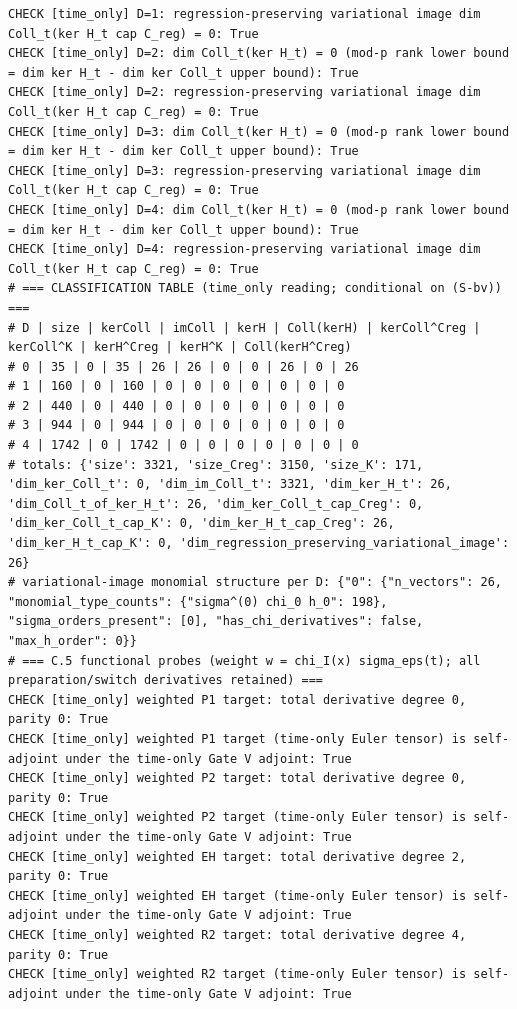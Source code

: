 \documentclass{article}
\theoremstyle{remark}
\begin{document}
\begin{lstlisting}
CHECK [time_only] D=1: regression-preserving variational image dim Coll_t(ker H_t cap C_reg) = 0: True
CHECK [time_only] D=2: dim Coll_t(ker H_t) = 0 (mod-p rank lower bound = dim ker H_t - dim ker Coll_t upper bound): True
CHECK [time_only] D=2: regression-preserving variational image dim Coll_t(ker H_t cap C_reg) = 0: True
CHECK [time_only] D=3: dim Coll_t(ker H_t) = 0 (mod-p rank lower bound = dim ker H_t - dim ker Coll_t upper bound): True
CHECK [time_only] D=3: regression-preserving variational image dim Coll_t(ker H_t cap C_reg) = 0: True
CHECK [time_only] D=4: dim Coll_t(ker H_t) = 0 (mod-p rank lower bound = dim ker H_t - dim ker Coll_t upper bound): True
CHECK [time_only] D=4: regression-preserving variational image dim Coll_t(ker H_t cap C_reg) = 0: True
# === CLASSIFICATION TABLE (time_only reading; conditional on (S-bv)) ===
# D | size | kerColl | imColl | kerH | Coll(kerH) | kerColl^Creg | kerColl^K | kerH^Creg | kerH^K | Coll(kerH^Creg)
# 0 | 35 | 0 | 35 | 26 | 26 | 0 | 0 | 26 | 0 | 26
# 1 | 160 | 0 | 160 | 0 | 0 | 0 | 0 | 0 | 0 | 0
# 2 | 440 | 0 | 440 | 0 | 0 | 0 | 0 | 0 | 0 | 0
# 3 | 944 | 0 | 944 | 0 | 0 | 0 | 0 | 0 | 0 | 0
# 4 | 1742 | 0 | 1742 | 0 | 0 | 0 | 0 | 0 | 0 | 0
# totals: {'size': 3321, 'size_Creg': 3150, 'size_K': 171, 'dim_ker_Coll_t': 0, 'dim_im_Coll_t': 3321, 'dim_ker_H_t': 26, 'dim_Coll_t_of_ker_H_t': 26, 'dim_ker_Coll_t_cap_Creg': 0, 'dim_ker_Coll_t_cap_K': 0, 'dim_ker_H_t_cap_Creg': 26, 'dim_ker_H_t_cap_K': 0, 'dim_regression_preserving_variational_image': 26}
# variational-image monomial structure per D: {"0": {"n_vectors": 26, "monomial_type_counts": {"sigma^(0) chi_0 h_0": 198}, "sigma_orders_present": [0], "has_chi_derivatives": false, "max_h_order": 0}}
# === C.5 functional probes (weight w = chi_I(x) sigma_eps(t); all preparation/switch derivatives retained) ===
CHECK [time_only] weighted P1 target: total derivative degree 0, parity 0: True
CHECK [time_only] weighted P1 target (time-only Euler tensor) is self-adjoint under the time-only Gate V adjoint: True
CHECK [time_only] weighted P2 target: total derivative degree 0, parity 0: True
CHECK [time_only] weighted P2 target (time-only Euler tensor) is self-adjoint under the time-only Gate V adjoint: True
CHECK [time_only] weighted EH target: total derivative degree 2, parity 0: True
CHECK [time_only] weighted EH target (time-only Euler tensor) is self-adjoint under the time-only Gate V adjoint: True
CHECK [time_only] weighted R2 target: total derivative degree 4, parity 0: True
CHECK [time_only] weighted R2 target (time-only Euler tensor) is self-adjoint under the time-only Gate V adjoint: True

\end{lstlisting}
\end{document}
